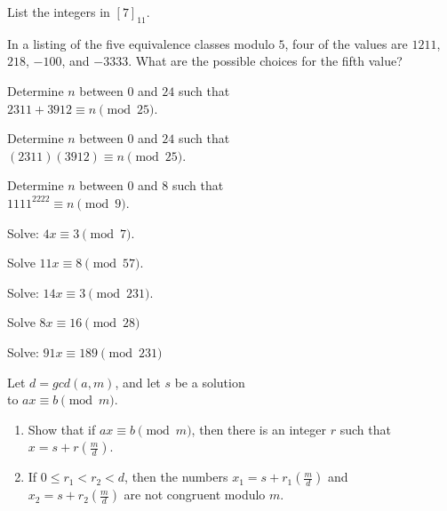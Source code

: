 \begin{exer}
List  the integers in $\left[7\right]_{11}$.
\end{exer}

\begin{exer}
In a listing of the five equivalence classes modulo $5$, four of the values
are $1211$, $218$, $-100$, and $-3333$. What are the possible choices for
the fifth value?
\end{exer}

\begin{exer}
Determine $n$ between  $0$ and $24$ such that\\
$2311+3912 \equiv n \pmod{25}$.
\end{exer}

\begin{exer}
Determine $n$ between  $0$ and $24$ such that \\
$(2311)(3912) \equiv n \pmod{25}$.
\end{exer}

\begin{exer}
Determine $n$ between  $0$ and $8$ such that\\
$1111^{2222}\equiv n \pmod 9$.
\end{exer}

\begin{exer}
Solve:  $4x\equiv 3\pmod 7$.
\end{exer}

\begin{exer}
Solve $11x\equiv 8\pmod {57}$.
\end{exer}

\begin{exer}
Solve: $14x\equiv 3\pmod {231}$.
\end{exer}

\begin{exer}
Solve $8x\equiv 16\pmod {28}$
\end{exer}

\begin{exer}
Solve: $91x\equiv 189\pmod {231}$
\end{exer}

\begin{exer}
Let $d = gcd(a,m)$, and let $s$ be a solution\\
 to $ax \equiv b \pmod{m}$.
\begin{enumerate}[label=(\alph*)]
 \item Show that if $ax \equiv b \pmod{m}$, then there is an integer $r$ such that
 $x = s + r\left(\frac{m}{d}\right)$.
 
 \item If $0\leq r_1< r_2 < d$, then the numbers $x_1 = s + r_1\left(\frac{m}{d}\right)$
 and\\
  $x_2 = s + r_2\left(\frac{m}{d}\right)$ are not congruent modulo $m$.
\end{enumerate}
\end{exer}

